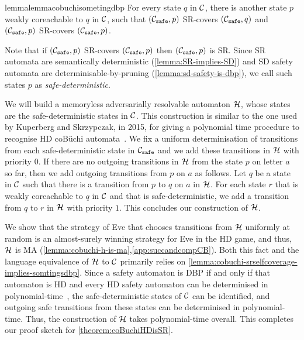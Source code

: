 \begin{restatable}{lemma}{lemmacobuchisometingdbp}\label{lemma:cobuchi-srselfcoverage-implies-somtingsdbp}
    For every state $q$ in $\mathcal{C}$, there is another state $p$ weakly coreachable to $q$ in $\mathcal{C}$, such that $(\mathcal{C}_{\texttt{safe}},p)$ SR-covers $(\mathcal{C}_{\texttt{safe}},q)$ and $(\mathcal{C}_{\texttt{safe}},p)$ SR-covers $(\mathcal{C}_{\texttt{safe}},p)$.  
\end{restatable}

Note that if $(\mathcal{C}_{\texttt{safe}},p)$ SR-covers $(\mathcal{C}_{\texttt{safe}},p)$ then $(\mathcal{C}_{\texttt{safe}},p)$ is SR. Since SR automata are semantically deterministic (\cref{lemma:SR-implies-SD}) and SD safety automata are determinisable-by-pruning (\cref{lemma:sd-safety-is-dbp}), we call  such states $p$ as \emph{safe-deterministic}. 

We will build a memoryless adversarially resolvable automaton $\mathcal{H}$, whose states are the safe-deterministic states in $\mathcal{C}$. This construction is similar to the one used by Kuperberg and Skrzypczak, in 2015, for giving a polynomial time procedure to recognise HD coB\"uchi automata~\cite[Section E.7 in the full version]{KS15}.  We fix a uniform determinisation of transitions from each safe-deterministic state in $\mathcal{C}_{\texttt{safe}}$ and we add these transitions in $\mathcal{H}$ with priority 0. If there are no outgoing transitions in $\mathcal{H}$ from the state $p$ on letter $a$ so far, then we add outgoing transitions from $p$ on $a$ as follows. Let $q$ be a state in $\mathcal{C}$ such that there is a transition from $p$ to $q$ on $a$ in $\mathcal{H}$. For each state $r$ that is weakly coreachable to $q$ in $\mathcal{C}$ and that is safe-deterministic, we add a transition from $q$ to $r$ in $\mathcal{H}$ with priority $1$. This concludes our construction of $\mathcal{H}$.

We show that the strategy of Eve that chooses transitions from $\mathcal{H}$ uniformly at random is an almost-surely winning strategy for Eve in the HD game, and thus, $\mathcal{H}$ is MA (\cref{lemma:cobuchi-h-is-ma},\cref{app:succandcompCB}). Both this fact and the language equivalence of $\mathcal{H}$ to $\mathcal{C}$ primarily relies on \cref{lemma:cobuchi-srselfcoverage-implies-somtingsdbp}. Since a safety automaton is DBP if and only if that automaton is HD and every HD safety automaton can be determinised in polynomial-time~\cite{BL23quantitative},  the safe-deterministic states of $\mathcal{C}$ can be identified, and outgoing safe transitions from these states can be determinised in polynomial-time. Thus, the construction of $\mathcal{H}$ takes polynomial-time overall. This completes our proof sketch for \cref{theorem:coBuchiHDisSR}.




